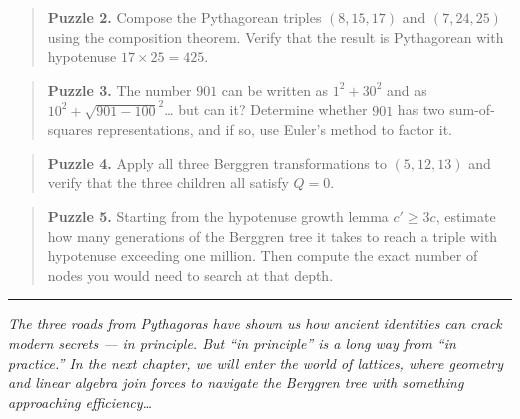 \begin{quote}
\textbf{Puzzle 2.} Compose the Pythagorean triples \((8, 15, 17)\) and \((7, 24, 25)\) using the composition theorem. Verify that the result is Pythagorean with hypotenuse \(17 \times 25 = 425\).
\end{quote}

\begin{quote}
\textbf{Puzzle 3.} The number \(901\) can be written as \(1^2 + 30^2\) and as \(10^2 + \sqrt{901 - 100}^2\)\ldots{} but can it? Determine whether \(901\) has two sum-of-squares representations, and if so, use Euler's method to factor it.
\end{quote}

\begin{quote}
\textbf{Puzzle 4.} Apply all three Berggren transformations to \((5, 12, 13)\) and verify that the three children all satisfy \(Q = 0\).
\end{quote}

\begin{quote}
\textbf{Puzzle 5.} Starting from the hypotenuse growth lemma \(c' \geq 3c\), estimate how many generations of the Berggren tree it takes to reach a triple with hypotenuse exceeding one million. Then compute the exact number of nodes you would need to search at that depth.
\end{quote}

\bigskip\noindent\rule{\linewidth}{0.4pt}\bigskip

\emph{The three roads from Pythagoras have shown us how ancient identities can crack modern secrets --- in principle. But ``in principle'' is a long way from ``in practice.'' In the next chapter, we will enter the world of lattices, where geometry and linear algebra join forces to navigate the Berggren tree with something approaching efficiency\ldots{}}

